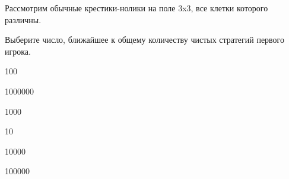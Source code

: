 
\begin{question}
Рассмотрим обычные крестики-нолики на поле 3x3, все клетки которого различны.

Выберите число, ближайшее к общему количеству чистых стратегий первого игрока.
\begin{answerlist}
  \item 100
  \item 1000000
  \item 1000
  \item 10
  \item 10000
  \item 100000
\end{answerlist}
\end{question}


